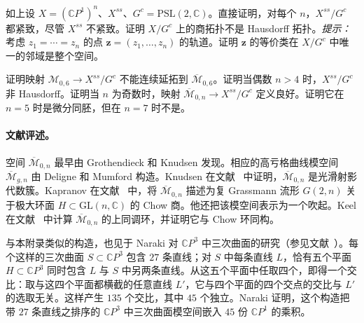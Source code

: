 \begin{exercise}\label{ex:D-7-1}
如上设 $X=(\mathbb CP^1)^n$、$X^{ss}$、$G^c=\mathrm{PSL}(2,\mathbb C)$。直接证明，对每个 $n$，$X^{ss}/G^c$ 都紧致，尽管 $X^{ss}$ 不紧致。证明 $X/G^c$ 上的商拓扑不是 Hausdorff 拓扑。\emph{提示：}考虑 $z_1=\cdots=z_n$ 的点 $\mathbf z=(z_1,\ldots,z_n)$ 的轨道。证明 $\mathbf z$ 的等价类在 $X/G^c$ 中唯一的邻域是整个空间。
\end{exercise}

\begin{exercise}\label{ex:D-7-2}
证明映射 $\mathcal M_{0,6}\to X^{ss}/G^c$ 不能连续延拓到 $\overline{\mathcal M}_{0,6}$。证明当偶数 $n>4$ 时，$X^{ss}/G^c$ 非 Hausdorff。证明当 $n$ 为奇数时，映射 $\overline{\mathcal M}_{0,n}\to X^{ss}/G^c$ 定义良好。证明它在 $n=5$ 时是微分同胚，但在 $n=7$ 时不是。
\end{exercise}

\paragraph{文献评述。}
空间 $\overline{\mathcal M}_{0,n}$ 最早由 Grothendieck 和 Knudsen 发现。相应的高亏格曲线模空间 $\overline{\mathcal M}_{g,n}$ 由 Deligne 和 Mumford 构造。Knudsen 在文献~ 中证明，$\overline{\mathcal M}_{0,n}$ 是光滑射影代数簇。Kapranov 在文献~ 中，将 $\overline{\mathcal M}_{0,n}$ 描述为复 Grassmann 流形 $G(2,n)$ 关于极大环面 $H\subset\mathrm{GL}(n,\mathbb C)$ 的 Chow 商。他还把该模空间表示为一个吹起。Keel 在文献~ 中计算 $\overline{\mathcal M}_{0,n}$ 的上同调环，并证明它与 Chow 环同构。

与本附录类似的构造，也见于 Naraki 对 $\mathbb CP^3$ 中三次曲面的研究（参见文献~）。每个这样的三次曲面 $S\subset\mathbb CP^3$ 包含 $27$ 条直线；对 $S$ 中每条直线 $L$，恰有五个平面 $H\subset\mathbb CP^3$ 同时包含 $L$ 与 $S$ 中另两条直线。从这五个平面中任取四个，即得一个交比：取与这四个平面都横截的任意直线 $L'$，它与四个平面的四个交点的交比与 $L'$ 的选取无关。这样产生 $135$ 个交比，其中 $45$ 个独立。Naraki 证明，这个构造把带 $27$ 条直线之排序的 $\mathbb CP^3$ 中三次曲面模空间嵌入 $45$ 份 $\mathbb CP^1$ 的乘积。
